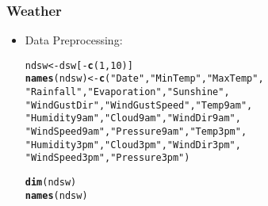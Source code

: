 \documentclass{beamer}\usepackage[]{graphicx}\usepackage[]{color}
\makeatletter
\newcommand{\hlnum}[1]{\textcolor[rgb]{0.686,0.059,0.569}{#1}}%
\newcommand{\hlstr}[1]{\textcolor[rgb]{0.192,0.494,0.8}{#1}}%
\newcommand{\hlopt}[1]{\textcolor[rgb]{0,0,0}{#1}}%
\newcommand{\hlstd}[1]{\textcolor[rgb]{0.345,0.345,0.345}{#1}}%
\newcommand{\hlkwb}[1]{\textcolor[rgb]{0.69,0.353,0.396}{#1}}%
\newcommand{\hlkwd}[1]{\textcolor[rgb]{0.737,0.353,0.396}{\textbf{#1}}}%
\newenvironment{kframe}{%
 \def\at@end@of@kframe{}%
 \ifinner\ifhmode%
  \def\at@end@of@kframe{\end{minipage}}%
  \begin{minipage}{\columnwidth}%
 \fi\fi%
 \def\FrameCommand##1{\hskip\@totalleftmargin \hskip-\fboxsep
 \colorbox{shadecolor}{##1}\hskip-\fboxsep
     \hskip-\linewidth \hskip-\@totalleftmargin \hskip\columnwidth}%
 \MakeFramed {\advance\hsize-\width
   \@totalleftmargin\z@ \linewidth\hsize
   \@setminipage}}%
 {\par\unskip\endMakeFramed%
 \at@end@of@kframe}
\newenvironment{knitrout}{}{} %
\makeatother
\begin{document}
\begin{frame}[fragile]
\frametitle{Weather}
\begin{itemize}
\item Data Preprocessing:
\begin{knitrout}
\color{fgcolor}\begin{kframe}
\begin{alltt}
\hlstd{ndsw} \hlkwb{<-} \hlstd{dsw[}\hlopt{-}\hlkwd{c}\hlstd{(}\hlnum{1}\hlstd{,} \hlnum{10}\hlstd{)]}
\hlkwd{names}\hlstd{(ndsw)} \hlkwb{<-} \hlkwd{c}\hlstd{(}\hlstr{"Date"}\hlstd{,} \hlstr{"MinTemp"}\hlstd{,} \hlstr{"MaxTemp"}\hlstd{,}
  \hlstr{"Rainfall"}\hlstd{,} \hlstr{"Evaporation"}\hlstd{,} \hlstr{"Sunshine"}\hlstd{,}
  \hlstr{"WindGustDir"}\hlstd{,} \hlstr{"WindGustSpeed"}\hlstd{,} \hlstr{"Temp9am"}\hlstd{,}
  \hlstr{"Humidity9am"}\hlstd{,} \hlstr{"Cloud9am"}\hlstd{,} \hlstr{"WindDir9am"}\hlstd{,}
  \hlstr{"WindSpeed9am"}\hlstd{,} \hlstr{"Pressure9am"}\hlstd{,} \hlstr{"Temp3pm"}\hlstd{,}
  \hlstr{"Humidity3pm"}\hlstd{,} \hlstr{"Cloud3pm"}\hlstd{,} \hlstr{"WindDir3pm"}\hlstd{,}
  \hlstr{"WindSpeed3pm"}\hlstd{,} \hlstr{"Pressure3pm"}\hlstd{)}
\end{alltt}
\end{kframe}
\end{knitrout}
\begin{knitrout}
\color{fgcolor}\begin{kframe}
\begin{alltt}
\hlkwd{dim}\hlstd{(ndsw)}
\hlkwd{names}\hlstd{(ndsw)}
\end{alltt}
\end{kframe}
\end{knitrout}
\end{itemize}
\end{frame}
\end{document}

